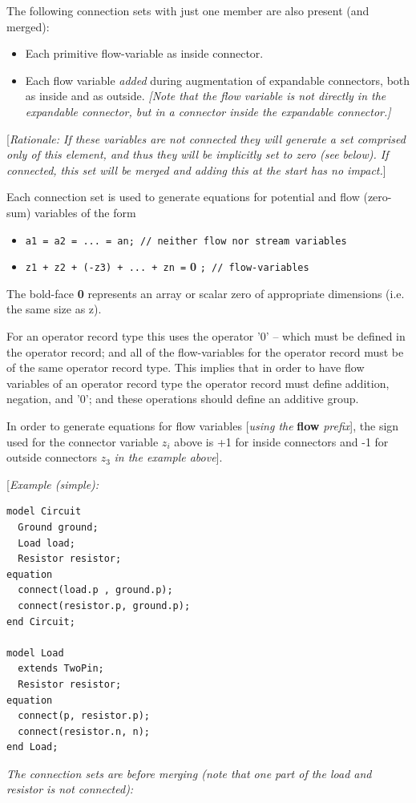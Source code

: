 \documentclass[10pt,a4paper]{report}
\begin{document}
The following connection sets with just one member are also present (and
merged):

\begin{itemize}
\item
  Each primitive flow-variable as inside connector.
\item
  Each flow variable \emph{added} during augmentation of expandable
  connectors, both as inside and as outside. \emph{{[}Note that the flow
  variable is not directly in the expandable connector, but in a
  connector inside the expandable connector.{]}}
\end{itemize}

{[}\emph{Rationale: If these variables are not connected they will
generate a set comprised only of this element, and thus they will be
implicitly set to zero (see below). If connected, this set will be
merged and adding this at the start has no impact.}{]}

Each connection set is used to generate equations for potential and flow
(zero-sum) variables of the form

\begin{itemize}
\item
\lstinline!a1 = a2 = ... = an; // neither flow nor stream variables!
\item
\lstinline!z1 + z2 + (-z3) + ... + zn =! \textbf{0} \lstinline!; // flow-variables!
\end{itemize}

The bold-face \textbf{0} represents an array or scalar zero of
appropriate dimensions (i.e. the same size as z).

For an operator record type this uses the operator '0' -- which must be
defined in the operator record; and all of the flow-variables for the
operator record must be of the same operator record type. This implies
that in order to have flow variables of an operator record type the
operator record must define addition, negation, and '0'; and these
operations should define an additive group.

In order to generate equations for flow variables {[}\emph{using the}
\textbf{flow} \emph{prefix}{]}, the sign used for the connector variable
$z_i$ above is +1 for inside connectors and -1 for outside
connectors $z_3$ \emph{in the example above}{]}.

{[}\emph{Example (simple):}

\begin{lstlisting}[language=modelica]
model Circuit
  Ground ground;
  Load load;
  Resistor resistor;
equation
  connect(load.p , ground.p);
  connect(resistor.p, ground.p);
end Circuit;

model Load
  extends TwoPin;
  Resistor resistor;
equation
  connect(p, resistor.p);
  connect(resistor.n, n);
end Load;
\end{lstlisting}
\emph{The connection sets are before merging (note that one part of the
load and resistor is not connected):}
\end{document}
